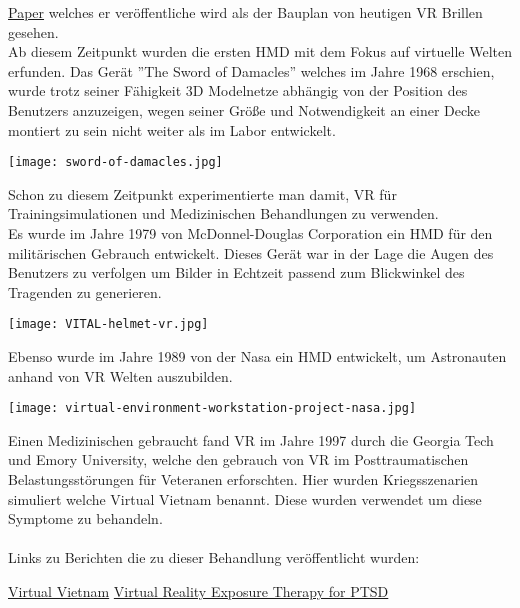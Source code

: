 \href{http://worrydream.com/refs/Sutherland%20-%20The%20Ultimate%20Display.pdf}{Paper} welches er veröffentliche wird als der Bauplan 
von heutigen VR Brillen gesehen.\cite{virtualrealityhistory}\\
Ab diesem Zeitpunkt wurden die ersten HMD mit dem Fokus auf virtuelle Welten erfunden. Das Gerät ''The Sword
of Damacles'' welches im Jahre 1968 erschien, wurde trotz seiner Fähigkeit 3D Modelnetze abhängig von der Position des Benutzers
anzuzeigen, wegen seiner Größe und Notwendigkeit an einer Decke montiert zu sein nicht weiter als im Labor
entwickelt.\cite{virtualrealityhistory} \\
\begin{center}
    \texttt{[image: sword-of-damacles.jpg]}\cite{swordofdamacles}
\end{center}
Schon zu diesem Zeitpunkt experimentierte man damit, VR für Trainingsimulationen und Medizinischen Behandlungen zu verwenden. \\ 
Es wurde im Jahre 1979 von McDonnel-Douglas Corporation ein HMD für den militärischen Gebrauch entwickelt. Dieses Gerät war in der
Lage die Augen des Benutzers zu verfolgen um Bilder in Echtzeit passend zum Blickwinkel des Tragenden zu generieren.\cite{virtualrealityhistory}
\begin{center}
    \texttt{[image: VITAL-helmet-vr.jpg]}\cite{vitalhelmet}
\end{center}
\newpage \noindent
Ebenso wurde im Jahre 1989 von der Nasa ein HMD entwickelt, um Astronauten anhand von VR Welten auszubilden.  
\begin{center}
    \texttt{[image: virtual-environment-workstation-project-nasa.jpg]}\cite{nasahelmet}
\end{center}
Einen Medizinischen gebraucht fand VR im Jahre 1997 durch die Georgia Tech und Emory University, welche den gebrauch von VR im
Posttraumatischen Belastungsstörungen für Veteranen erforschten. Hier wurden Kriegsszenarien simuliert welche Virtual Vietnam benannt. Diese
wurden verwendet um diese Symptome zu behandeln.\\ \\ 
Links zu Berichten die zu dieser Behandlung veröffentlicht wurden:
\begin{center}
    \href{http://gotz.web.unc.edu/files/2013/10/icat.pdf}{Virtual Vietnam}
    \href{http://gotz.web.unc.edu/files/2013/10/jts1999.pdf}{Virtual Reality Exposure Therapy for PTSD} \\
    \cite{virtualrealityhistory}
\end{center}
